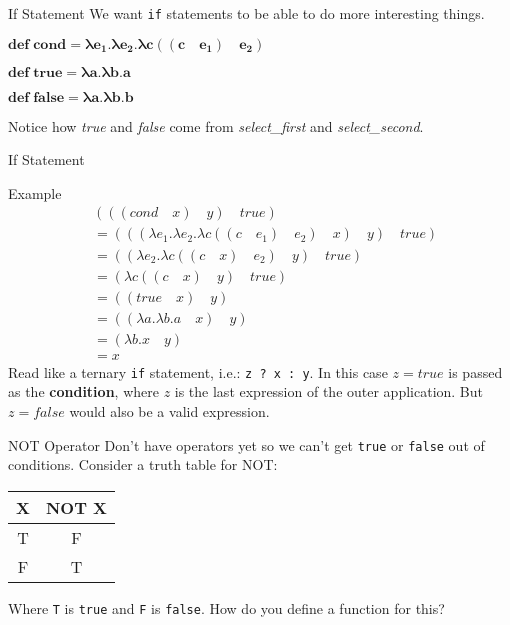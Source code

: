 \documentclass{beamer}
\begin{document}
\begin{frame}{If Statement}
We want \texttt{if} statements to be able to do more interesting things.
\begin{framed} $\mathbf{def \; cond = \lambda e_1 . \lambda e_2 . \lambda c ((c \quad e_1) \quad e_2)}$ \end{framed}
\begin{framed} $\mathbf{def \; true = \lambda a . \lambda b . a}$ \end{framed}
\begin{framed} $\mathbf{def \; false = \lambda a . \lambda b . b}$ \end{framed}
Notice how \textit{true} and \textit{false} come from \textit{select\_first} and \textit{select\_second}.
\end{frame}

\begin{frame}{If Statement}
\begin{block}{Example}
\begin{align*}
&(((cond \quad x) \quad y) \quad true) \\
  &= (((\lambda e_1 . \lambda e_2 . \lambda c ((c \quad e_1) \quad e_2) \quad x) \quad y) \quad true) \\
  &= ((\lambda e_2 . \lambda c ((c \quad x) \quad e_2) \quad y) \quad true) \\
  &= (\lambda c ((c \quad x) \quad y) \quad true) \\
  &= ((true \quad x) \quad y) \\
  &= ((\lambda a . \lambda b . a \quad x) \quad y) \\
  &= (\lambda b . x \quad y) \\
  &= x
\end{align*}
Read like a ternary \texttt{if} statement, i.e.: \texttt{z ? x : y}. In this case $z = true$ is passed as the \textbf{condition}, where $z$ is the last expression of the outer application. But $z = false$ would also be a valid expression. 
\end{block}
\end{frame}

\begin{frame}{NOT Operator}
Don't have operators yet so we can't get \texttt{true} or \texttt{false} out of conditions. Consider a truth table for NOT:
\begin{table}
\centering
\begin{tabular}{c|c}
X & NOT X \\\hline
T & F \\
F & T
\end{tabular}
\end{table}
Where \texttt{T} is \texttt{true} and \texttt{F} is \texttt{false}. How do you define a function for this?
\end{frame}
\end{document}
